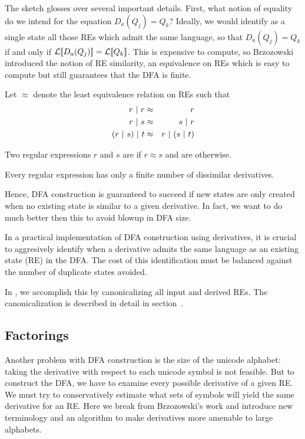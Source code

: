 The sketch glosses over several important details.  First, what notion of equality do we intend for the equation $D_a (Q_j) = Q_k$?  Ideally, we would identify as a single state all those REs which admit the same language, so that $D_a (Q_j) = Q_k$ if and only if $\mathcal{L}[ \! [ D_a (Q_j) ] \! ] = \mathcal{L}[ \! [ Q_k ] \! ]$.  This is expensive to compute, so Brzozowski introduced the notion of RE similarity, an equivalence on REs which is easy to compute but still guarantees that the DFA is finite.

Let $\approx$ denote the least equivalence relation on REs such that
\begin{eqnarray*}
r \ | \  r &\approx& r \\
r \ | \  s &\approx& s \ | \  r \\
(r \ | \  s) \ | \  t &\approx& r \ | \  (s \ | \  t)
\end{eqnarray*}

\begin{definition} Two regular expressions $r$ and $s$ are  if $r \approx s$ and are  otherwise.
\end{definition}

\begin{theorem} Every regular expression has only a finite number of dissimilar derivatives.
\end{theorem}

Hence, DFA construction is guaranteed to succeed if new states are only created when no existing state is similar to a given derivative.  In fact, we want to do much better then this to avoid blowup in DFA size.

\begin{remark}
In a practical implementation of DFA construction using derivatives, it is crucial to aggresively identify when a derivative admits the same language as an existing state (RE) in the DFA.  The cost of this identification must be balanced against the number of duplicate states avoided.
\end{remark}

In \flex{}, we accomplish this by canonicalizing all input and derived REs.  The canonicalization is described in detail in section~.

\subsection{Factorings}\label{sec:factorings}

Another problem with DFA construction is the size of the unicode alphabet: taking the derivative with respect to each unicode symbol is not feasible.  But to construct the DFA, we have to examine every possible derivative of a given RE.  We must try to conservatively estimate what sets of symbols will yield the same derivative for an RE.  Here we break from Brzozowski's work and introduce new terminology and an algorithm to make derivatives more amenable to large alphabets.

